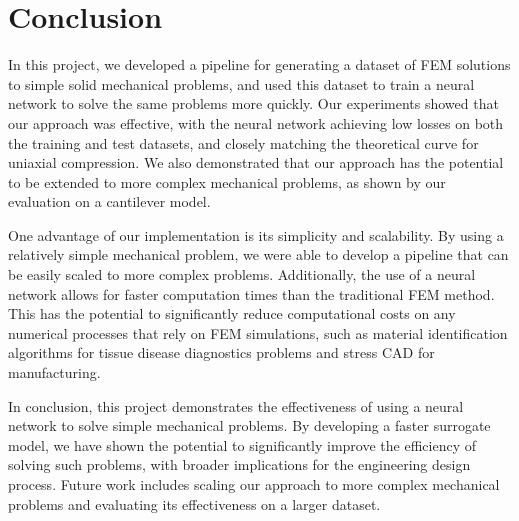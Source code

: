 \documentclass[11pt]{scrartcl} %
\begin{document}

\section{Conclusion}
In this project, we developed a pipeline for generating a dataset of FEM solutions to simple solid mechanical problems, and used this dataset to train a neural network to solve the same problems more quickly. Our experiments showed that our approach was effective, with the neural network achieving low losses on both the training and test datasets, and closely matching the theoretical curve for uniaxial compression. We also demonstrated that our approach has the potential to be extended to more complex mechanical problems, as shown by our evaluation on a cantilever model. 

One advantage of our implementation is its simplicity and scalability. By using a relatively simple mechanical problem, we were able to develop a pipeline that can be easily scaled to more complex problems. Additionally, the use of a neural network allows for faster computation times than the traditional FEM method. This has the potential to significantly reduce computational costs on any numerical processes that rely on FEM simulations, such as material identification algorithms for tissue disease diagnostics problems and stress CAD for manufacturing.

In conclusion, this project demonstrates the effectiveness of using a neural network to solve simple mechanical problems. By developing a faster surrogate model, we have shown the potential to significantly improve the efficiency of solving such problems, with broader implications for the engineering design process. Future work includes scaling our approach to more complex mechanical problems and evaluating its effectiveness on a larger dataset.
\end{document}
